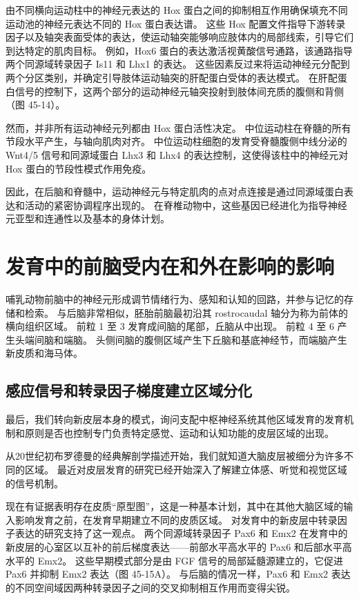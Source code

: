 由不同横向运动柱中的神经元表达的 Hox 蛋白之间的抑制相互作用确保填充不同运动池的神经元表达不同的 Hox 蛋白表达谱。 这些 Hox 配置文件指导下游转录因子以及轴突表面受体的表达，使运动轴突能够响应肢体内的局部线索，引导它们到达特定的肌肉目标。 例如，Hox6 蛋白的表达激活视黄酸信号通路，该通路指导两个同源域转录因子 Is11 和 Lhx1 的表达。 这些因素反过来将运动神经元分配到两个分区类别，并确定引导肢体运动轴突的肝配蛋白受体的表达模式。 在肝配蛋白信号的控制下，这两个部分的运动神经元轴突投射到肢体间充质的腹侧和背侧（图 45-14）。

然而，并非所有运动神经元列都由 Hox 蛋白活性决定。 中位运动柱在脊髓的所有节段水平产生，与轴向肌肉对齐。 中位运动柱细胞的发育受脊髓腹侧中线分泌的 Wnt4/5 信号和同源域蛋白 Lhx3 和 Lhx4 的表达控制，这使得该柱中的神经元对 Hox 蛋白的节段性模式作用免疫。

因此，在后脑和脊髓中，运动神经元与特定肌肉的点对点连接是通过同源域蛋白表达和活动的紧密协调程序出现的。 在脊椎动物中，这些基因已经进化为指导神经元亚型和连通性以及基本的身体计划。


\section{发育中的前脑受内在和外在影响的影响}
哺乳动物前脑中的神经元形成调节情绪行为、感知和认知的回路，并参与记忆的存储和检索。 与后脑非常相似，胚胎前脑最初沿其 rostrocaudal 轴分为称为前体的横向组织区域。 前粒 1 至 3 发育成间脑的尾部，丘脑从中出现。 前粒 4 至 6 产生头端间脑和端脑。 头侧间脑的腹侧区域产生下丘脑和基底神经节，而端脑产生新皮质和海马体。

\subsection{感应信号和转录因子梯度建立区域分化}
最后，我们转向新皮层本身的模式，询问支配中枢神经系统其他区域发育的发育机制和原则是否也控制专门负责特定感觉、运动和认知功能的皮层区域的出现。

从20世纪初布罗德曼的经典解剖学描述开始，我们就知道大脑皮层被细分为许多不同的区域。 最近对皮层发育的研究已经开始深入了解建立体感、听觉和视觉区域的信号机制。

现在有证据表明存在皮质“原型图”，这是一种基本计划，其中在其他大脑区域的输入影响发育之前，在发育早期建立不同的皮质区域。 对发育中的新皮层中转录因子表达的研究支持了这一观点。 两个同源域转录因子 Pax6 和 Emx2 在发育中的新皮层的心室区以互补的前后梯度表达——前部水平高水平的 Pax6 和后部水平高水平的 Emx2。 这些早期模式部分是由 FGF 信号的局部延髓源建立的，它促进 Pax6 并抑制 Emx2 表达（图 45-15A）。 与后脑的情况一样，Pax6 和 Emx2 表达的不同空间域因两种转录因子之间的交叉抑制相互作用而变得尖锐。

